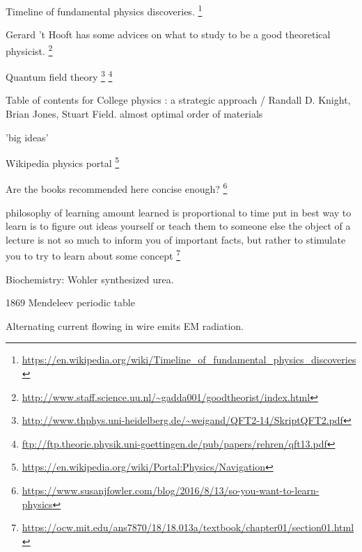 Timeline of fundamental physics discoveries.%
\footnote{\url{https://en.wikipedia.org/wiki/Timeline_of_fundamental_physics_discoveries}}

Gerard 't Hooft has some advices on what to study to be a good theoretical physicist.%
\footnote{\url{http://www.staff.science.uu.nl/~gadda001/goodtheorist/index.html}}



Quantum field theory%
\footnote{\url{http://www.thphys.uni-heidelberg.de/~weigand/QFT2-14/SkriptQFT2.pdf}}%
\footnote{\url{ftp://ftp.theorie.physik.uni-goettingen.de/pub/papers/rehren/qft13.pdf}}

Table of contents for College physics : a strategic approach / Randall D. Knight, Brian Jones, Stuart Field.
almost optimal order of materials

'big ideas'

Wikipedia physics portal%
\footnote{\url{https://en.wikipedia.org/wiki/Portal:Physics/Navigation}}









Are the books recommended here concise enough?%
\footnote{\url{https://www.susanjfowler.com/blog/2016/8/13/so-you-want-to-learn-physics}}

philosophy of learning
amount learned is proportional to time put in
best way to learn is to figure out ideas yourself or teach them to someone else
the object of  a lecture is not so much to inform you of important facts, but rather to stimulate you to try to learn about some concept
\footnote{\url{https://ocw.mit.edu/ans7870/18/18.013a/textbook/chapter01/section01.html}}


Biochemistry: Wohler synthesized urea.

1869 Mendeleev periodic table

Alternating current flowing in wire emits EM radiation.






